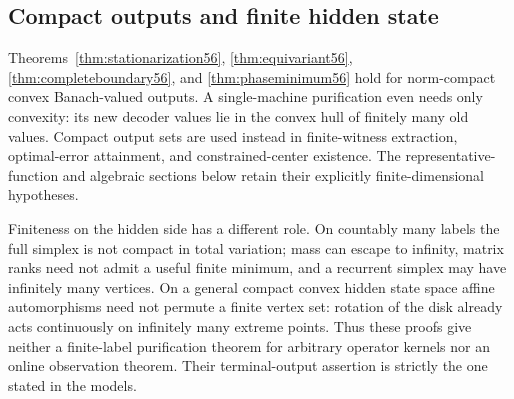 \subsection{Compact outputs and finite hidden state}
Theorems~\ref{thm:stationarization56}, \ref{thm:equivariant56}, \ref{thm:completeboundary56}, and \ref{thm:phaseminimum56} hold for norm-compact convex Banach-valued outputs. A single-machine purification even needs only convexity: its new decoder values lie in the convex hull of finitely many old values. Compact output sets are used instead in finite-witness extraction, optimal-error attainment, and constrained-center existence. The representative-function and algebraic sections below retain their explicitly finite-dimensional hypotheses.

Finiteness on the hidden side has a different role. On countably many labels the full simplex is not compact in total variation; mass can escape to infinity, matrix ranks need not admit a useful finite minimum, and a recurrent simplex may have infinitely many vertices. On a general compact convex hidden state space affine automorphisms need not permute a finite vertex set: rotation of the disk already acts continuously on infinitely many extreme points. Thus these proofs give neither a finite-label purification theorem for arbitrary operator kernels nor an online observation theorem. Their terminal-output assertion is strictly the one stated in the models.
